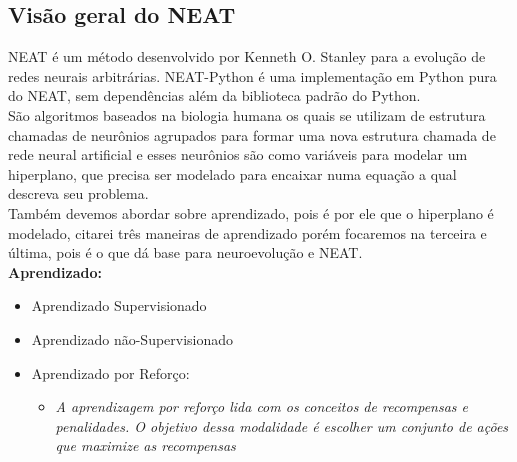 \subsection{\textbf{Visão geral do NEAT}}\label{sec:ANN}
%
NEAT é um método desenvolvido por Kenneth O. Stanley para a evolução de redes neurais arbitrárias. NEAT-Python é uma implementação em Python pura do NEAT, sem dependências além da biblioteca padrão do Python.\\
São algoritmos baseados na biologia humana
os quais se utilizam de estrutura chamadas de neurônios 
agrupados para formar uma nova estrutura chamada de rede neural artificial
e esses neurônios são como variáveis para modelar um hiperplano,
que precisa ser modelado para encaixar numa equação a qual descreva seu problema.\\ 
Também devemos abordar sobre aprendizado, pois é por ele que o hiperplano é modelado,
citarei três maneiras de aprendizado porém focaremos na terceira e última, pois é o que dá base para neuroevolução e NEAT.\\
		
		
{\bfseries Aprendizado:}

\begin{itemize}

\item Aprendizado Supervisionado 
\item Aprendizado não-Supervisionado 
\item Aprendizado por Reforço:
\begin{itemize}
\item \emph{A aprendizagem por reforço lida com os conceitos de recompensas e
penalidades. O objetivo dessa modalidade é escolher um conjunto de ações que
maximize as recompensas}
\end{itemize}
\end{itemize}

%






